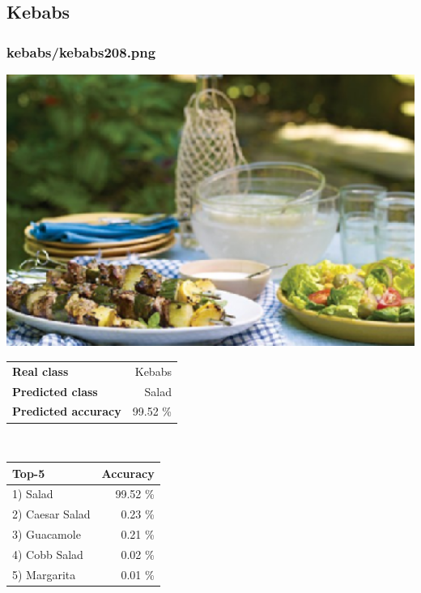 \subsection{Kebabs}
    
\subsubsection{kebabs/kebabs208.png}

\begin{minipage}[t]{0.4\textwidth}
	\vspace{0pt}
	\includegraphics[width=\linewidth]{images/evaluation-images/kebabs/kebabs208.png}
\end{minipage}
\hfill
\begin{minipage}[t]{0.5\textwidth}
	\vspace{0pt}\raggedright
	\begin{tabularx}{\textwidth}{X r}
		\small \textbf{Real class} & \small Kebabs\\
		\small \textbf{Predicted class} & \small Salad\\
		\small \textbf{Predicted accuracy} & \small 99.52 \%
    \end{tabularx}\\
    
    \vspace{6pt}
	\begin{tabularx}{\textwidth}{X r}
        \small \textbf{Top-5} & \small \textbf{Accuracy} \\
        \hline
		\small 1) Salad & \small 99.52 \%\\\small 2) Caesar Salad & \small 0.23 \%\\\small 3) Guacamole & \small 0.21 \%\\\small 4) Cobb Salad & \small 0.02 \%\\\small 5) Margarita & \small 0.01 \%
    \end{tabularx}
\end{minipage}
    
